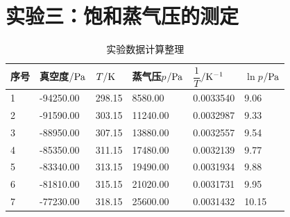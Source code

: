 \documentclass[UTF8,AutoFakeBold,a4paper]{article}
\begin{document}
	\newpage
	\section{实验三：饱和蒸气压的测定}
	\begin{table}[h]
		\centering
		\begin{tabular}{p{1cm}<{\centering} p{2.5cm}<{\centering} p{2.5cm}<{\centering} p{2.5cm}<{\centering} p{2.5cm}<{\centering} p{2.5cm}<{\centering}}
		\toprule
		序号 & 真空度$/\rm{Pa}$ & $T/\rm{K}$ & 蒸气压$p$$/\rm{Pa}$ & $\dfrac{1}{T}$$/\rm{K}^{-1}$ &$\ln{p}$$/\rm{Pa}$ \\ 
		\midrule
       1 & -94250.00 & 298.15 & 8580.00 & 0.0033540 & 9.06 \\ 
        2 & -91590.00 & 303.15 & 11240.00 & 0.0032987 & 9.33 \\ 
        3 & -88950.00 & 307.15 & 13880.00 & 0.0032557 & 9.54 \\ 
        4 & -85350.00 & 311.15 & 17480.00 & 0.0032139 & 9.77 \\ 
        5 & -83340.00 & 313.15 & 19490.00 & 0.0031934 & 9.88 \\ 
        6 & -81810.00 & 315.15 & 21020.00 & 0.0031731 & 9.95 \\ 
        7 & -77230.00 & 318.15 & 25600.00 & 0.0031432 & 10.15 \\ 		\bottomrule
		\end{tabular}	
		\label{ta1}
		\caption{实验数据计算整理}
\end{table}
\newpage
\end{document}
